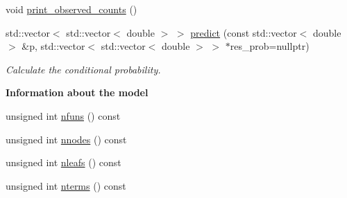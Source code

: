 \begin{DoxyCompactItemize}
\item 
void \hyperlink{class_a_phylo_model_a25623ae340bb6912a0427279b779c450}{print\+\_\+observed\+\_\+counts} ()
\item 
std\+::vector$<$ std\+::vector$<$ double $>$ $>$ \hyperlink{class_a_phylo_model_a5818916d43989b8a8dfa42b1fbde8e5c}{predict} (const std\+::vector$<$ double $>$ \&p, std\+::vector$<$ std\+::vector$<$ double $>$ $>$ $\ast$res\+\_\+prob=nullptr)
\begin{DoxyCompactList}\small\item\em Calculate the conditional probability. \end{DoxyCompactList}\end{DoxyCompactItemize}
\begin{Indent}\textbf{ Information about the model}\par
\begin{DoxyCompactItemize}
\item 
unsigned int \hyperlink{class_a_phylo_model_ad50c485128331dcfc3e24ef3765d36ef}{nfuns} () const
\item 
unsigned int \hyperlink{class_a_phylo_model_a5a13086298e421d18ed60e6ecfced009}{nnodes} () const
\item 
unsigned int \hyperlink{class_a_phylo_model_adfb761d08367323cd94e917a5249bd86}{nleafs} () const
\item 
unsigned int \hyperlink{class_a_phylo_model_ada9ba3e2df8586216573fa27566d92cb}{nterms} () const
\end{DoxyCompactItemize}
\end{Indent}
